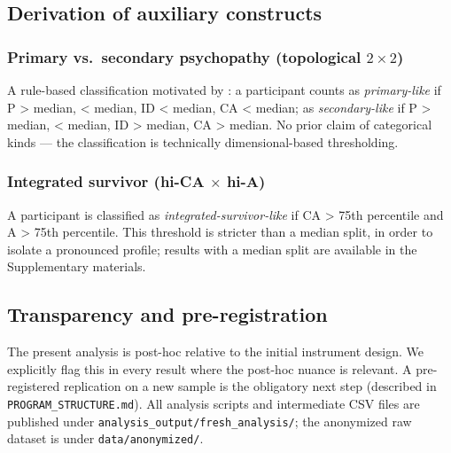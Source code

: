 \subsection{Derivation of auxiliary constructs}

\subsubsection{Primary vs.\ secondary psychopathy (topological $2\times 2$)}

A rule-based classification motivated by \citet{karpman1941}: a participant counts as \emph{primary-like} if P > median, \EAF{} < median, ID < median, CA < median; as \emph{secondary-like} if P > median, \EAF{} < median, ID > median, CA > median. No prior claim of categorical kinds --- the classification is technically dimensional-based thresholding.

\subsubsection{Integrated survivor (hi-CA $\times$ hi-A)}

A participant is classified as \emph{integrated-survivor-like} if CA > 75th percentile and A > 75th percentile. This threshold is stricter than a median split, in order to isolate a pronounced profile; results with a median split are available in the Supplementary materials.

\subsection{Transparency and pre-registration}

The present analysis is post-hoc relative to the initial instrument design. We explicitly flag this in every result where the post-hoc nuance is relevant. A pre-registered replication on a new sample is the obligatory next step (described in \texttt{PROGRAM\_STRUCTURE.md}). All analysis scripts and intermediate CSV files are published under \texttt{analysis\_output/fresh\_analysis/}; the anonymized raw dataset is under \texttt{data/anonymized/}.
